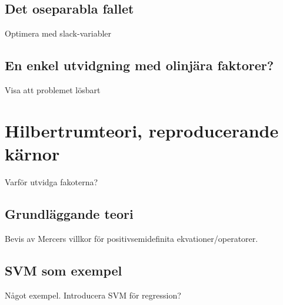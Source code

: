 \documentclass[a4paper, 12pt]{report}
\theoremstyle{definition}
\theoremstyle{remark}
\begin{document}
\section{Det oseparabla fallet}
Optimera med slack-variabler
\section{En enkel utvidgning med olinjära faktorer?}
Visa att problemet lösbart
\chapter{Hilbertrumteori, reproducerande kärnor}\label{chap:hilbert}
Varför utvidga fakoterna?
\section{Grundläggande teori}
Bevis av Mercers villkor för positivsemidefinita ekvationer/operatorer.
\section{SVM som exempel}
Något exempel. Introducera SVM för regression?



\end{document}
